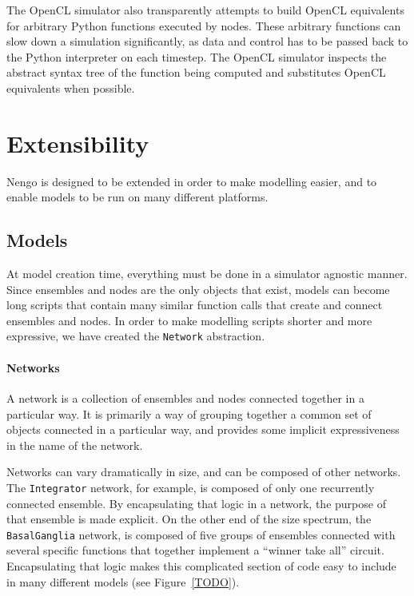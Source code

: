 \documentclass{frontiersSCNS}
\begin{document}
The OpenCL simulator also transparently
attempts to build OpenCL equivalents
for arbitrary Python functions
executed by nodes.
These arbitrary functions
can slow down a simulation significantly,
as data and control has to be passed back
to the Python interpreter
on each timestep.
The OpenCL simulator inspects
the abstract syntax tree
of the function being computed
and substitutes OpenCL equivalents when possible.

\section{Extensibility}

Nengo is designed to be extended
in order to make modelling easier,
and to enable models to be run
on many different platforms.

\subsection{Models}

At model creation time,
everything must be done
in a simulator agnostic manner.
Since ensembles and nodes
are the only objects that exist,
models can become long scripts
that contain many
similar function calls that
create and connect ensembles and nodes.
In order to make modelling scripts
shorter and more expressive,
we have created the \texttt{Network} abstraction.

\paragraph{Networks}
A network is a collection of ensembles and nodes
connected together in a particular way.
It is primarily a way of grouping together
a common set of objects connected in a particular way,
and provides some implicit expressiveness
in the name of the network.

Networks can vary dramatically in size,
and can be composed of other networks.
The \texttt{Integrator} network, for example,
is composed of only one recurrently connected ensemble.
By encapsulating that logic in a network,
the purpose of that ensemble is made explicit.
On the other end of the size spectrum,
the \texttt{BasalGanglia} network,
is composed of five groups of ensembles
connected with several specific functions
that together implement a ``winner take all'' circuit.
Encapsulating that logic
makes this complicated section of code
easy to include in many different models
(see Figure~\ref{TODO}).
\end{document}
